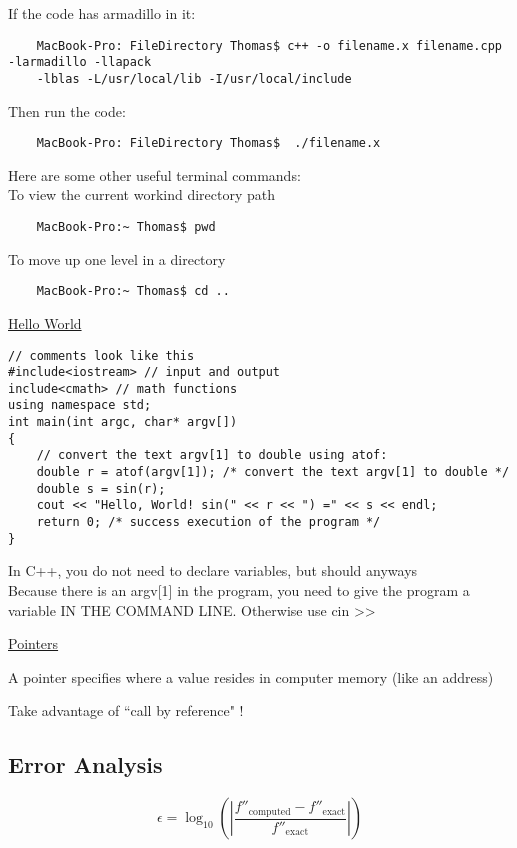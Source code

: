 \documentclass[10pt]{article} %
\begin{document}
If the code has armadillo in it:
\begin{verbatim}
    MacBook-Pro: FileDirectory Thomas$ c++ -o filename.x filename.cpp -larmadillo -llapack 
    -lblas -L/usr/local/lib -I/usr/local/include 
\end{verbatim}

Then run the code:
\begin{verbatim}
    MacBook-Pro: FileDirectory Thomas$  ./filename.x
\end{verbatim}

Here are some other useful terminal commands: \\
To view the current workind directory path
\begin{verbatim}
    MacBook-Pro:~ Thomas$ pwd
\end{verbatim}
To move up one level in a directory
\begin{verbatim}
    MacBook-Pro:~ Thomas$ cd ..
\end{verbatim}

\pagebreak

\underline{Hello World}

\begin{lstlisting}
// comments look like this
#include<iostream> // input and output
include<cmath> // math functions
using namespace std;
int main(int argc, char* argv[])
{
    // convert the text argv[1] to double using atof:
    double r = atof(argv[1]); /* convert the text argv[1] to double */
    double s = sin(r);
    cout << "Hello, World! sin(" << r << ") =" << s << endl;
    return 0; /* success execution of the program */
}
\end{lstlisting}

In C++, you do not need to declare variables, but should anyways \\ \hspace{.4cm} Because there is an argv[1] in the program, you need to give the program a variable IN THE COMMAND LINE. Otherwise use cin >>

\underline{Pointers}

A pointer specifies where a value resides in computer memory (like an address)

Take advantage of ``call by reference" !

\subsection{Error Analysis}

\[ \epsilon = \log_{10} \left( \left| \dfrac{f''_{\text{computed}}-f''_{\text{exact}}}{f''_{\text{exact}}} \right| \right) \]
\end{document}
